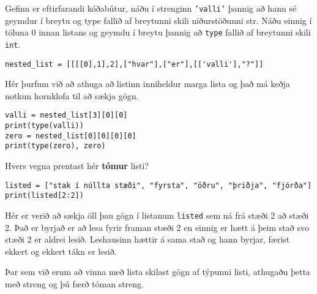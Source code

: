 \begin{exercise}\label{lst4}
	Gefinn er eftirfarandi kóðabútur, náðu í strenginn \texttt{'valli'} þannig að hann sé geymdur í breytu og type fallið af breytunni skili niðurstöðunni str.
	Náðu einnig í töluna 0 innan listans og geymdu í breytu þannig að \texttt{type} fallið af breytunni skili \texttt{int}. 
\begin{lstlisting}
nested_list = [[[[0],1],2],["hvar"],["er"],[['valli'],"?"]]\end{lstlisting}
\end{exercise}
\begin{Answer}[ref={lst4}]
Hér þurfum við að athuga að listinn inniheldur marga lista og það má keðja notkun hornklofa til að sækja gögn.
	\begin{lstlisting}
valli = nested_list[3][0][0]
print(type(valli))
zero = nested_list[0][0][0][0]
print(type(zero), zero)\end{lstlisting}
\end{Answer}

\begin{exercise}\label{lst5}
Hvers vegna prentast hér \textbf{tómur} listi? 
\begin{lstlisting}
listed = ["stak í núllta stæði", "fyrsta", "öðru", "þriðja", "fjórða"]
print(listed[2:2])\end{lstlisting}
\end{exercise}
\begin{Answer}[ref={lst5}]
Hér er verið að sækja öll þau gögn í listanum \texttt{listed} sem ná frá stæði 2 að stæði 2.
Það er byrjað er að lesa fyrir framan stæði 2 en einnig er hætt á þeim stað svo stæði 2 er aldrei lesið.
Leshausinn hættir á sama stað og hann byrjar, færist ekkert og ekkert tákn er lesið.

Þar sem við erum að vinna með lista skilast gögn af týpunni listi, athugaðu þetta með streng og þú færð tóman streng.
\end{Answer}

